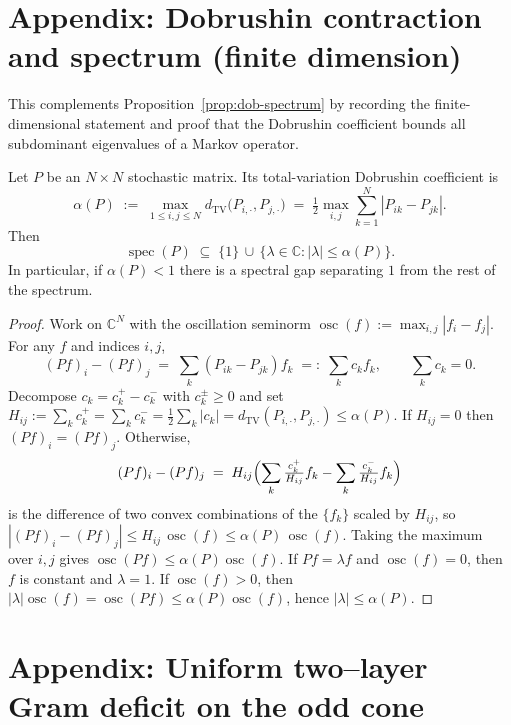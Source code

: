 \documentclass[11pt]{amsart}
\begin{document}
\section{Appendix: Dobrushin contraction and spectrum (finite dimension)}

This complements Proposition~\ref{prop:dob-spectrum} by recording the finite-dimensional statement and proof that the Dobrushin coefficient bounds all subdominant eigenvalues of a Markov operator.

\begin{theorem}
Let $P$ be an $N\times N$ stochastic matrix. Its total-variation Dobrushin coefficient is
\[
  \alpha(P)\;:=\;\max_{1\le i,j\le N} d_{\mathrm{TV}}\bigl(P_{i,\cdot},P_{j,\cdot}\bigr)
  \;=\;\tfrac12\max_{i,j}\sum_{k=1}^N |P_{ik}-P_{jk}|.
\]
Then
\[
  \operatorname{spec}(P)\;\subseteq\;\{1\}\,\cup\,\{\lambda\in\mathbb{C}: |\lambda|\le \alpha(P)\}.
\]
In particular, if $\alpha(P)<1$ there is a spectral gap separating $1$ from the rest of the spectrum.
\end{theorem}

\begin{proof}
Work on $\mathbb{C}^N$ with the oscillation seminorm $\operatorname{osc}(f):=\max_{i,j}|f_i-f_j|$. For any $f$ and indices $i,j$,
\[
  (Pf)_i-(Pf)_j\;=\;\sum_k (P_{ik}-P_{jk}) f_k\;=:\;\sum_k c_k f_k,\qquad \sum_k c_k=0.
\]
Decompose $c_k=c_k^+-c_k^-$ with $c_k^\pm\ge 0$ and set $H_{ij}:=\sum_k c_k^+=\sum_k c_k^- = \tfrac12\sum_k |c_k| = d_{\mathrm{TV}}(P_{i,\cdot},P_{j,\cdot})\le \alpha(P)$. If $H_{ij}=0$ then $(Pf)_i=(Pf)_j$. Otherwise,
\[
  (Pf)_i-(Pf)_j\;=\;H_{ij}\Bigl(\sum_k \tfrac{c_k^+}{H_{ij}} f_k - \sum_k \tfrac{c_k^-}{H_{ij}} f_k\Bigr)
\]
is the difference of two convex combinations of the $\{f_k\}$ scaled by $H_{ij}$, so $|(Pf)_i-(Pf)_j|\le H_{ij}\,\operatorname{osc}(f)\le \alpha(P)\,\operatorname{osc}(f)$. Taking the maximum over $i,j$ gives $\operatorname{osc}(Pf)\le \alpha(P)\operatorname{osc}(f)$. If $Pf=\lambda f$ and $\operatorname{osc}(f)=0$, then $f$ is constant and $\lambda=1$. If $\operatorname{osc}(f)>0$, then $|\lambda|\operatorname{osc}(f)=\operatorname{osc}(Pf)\le \alpha(P)\operatorname{osc}(f)$, hence $|\lambda|\le \alpha(P)$.
\end{proof}

\section{Appendix: Uniform two--layer Gram deficit on the odd cone}
\end{document}
